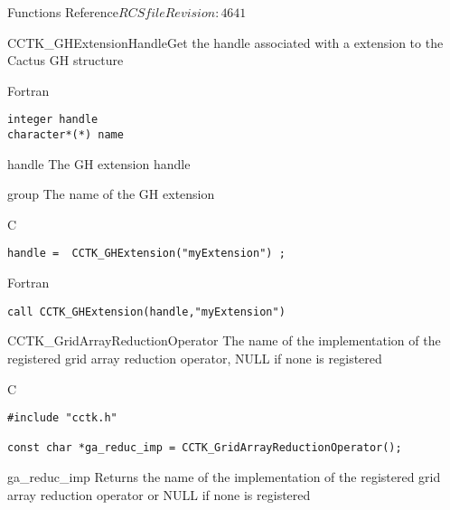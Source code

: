 \begin{cactuspart}{ Functions Reference}{$RCSfile$}{$Revision: 4641 $}
\begin{FunctionDescription}{CCTK\_GHExtensionHandle}{Get the handle associated with a extension to the Cactus GH structure}
\begin{SynopsisSection}
\begin{Synopsis}{Fortran}
\begin{verbatim}
integer handle
character*(*) name\end{verbatim}
\end{Synopsis}
\end{SynopsisSection}
\begin{ParameterSection}
\begin{Parameter}{handle}
The GH extension handle
\end{Parameter}
\begin{Parameter}{group}
The name of the GH extension
\end{Parameter}
\end{ParameterSection}

\begin{ExampleSection}
\begin{Example}{C}
\begin{verbatim}
handle =  CCTK_GHExtension("myExtension") ;
\end{verbatim}
\end{Example}
\begin{Example}{Fortran}
\begin{verbatim}
call CCTK_GHExtension(handle,"myExtension")
\end{verbatim}
\end{Example}
\end{ExampleSection}
\end{FunctionDescription}



\begin{FunctionDescription}{CCTK\_GridArrayReductionOperator}
\label{CCTK-GridArrayReductionOperator}
The name of the implementation of the registered grid array reduction operator, NULL if none is registered

\begin{SynopsisSection}
\begin{Synopsis}{C}
\begin{verbatim}
#include "cctk.h"

const char *ga_reduc_imp = CCTK_GridArrayReductionOperator();
\end{verbatim}
\end{Synopsis}
\end{SynopsisSection}

\begin{ResultSection}
\begin{Result}{ga\_reduc\_imp}
Returns the name of the implementation of the registered grid array reduction operator
or NULL if none is registered
\end{Result}
\end{ResultSection}



\end{FunctionDescription}
\end{cactuspart}
